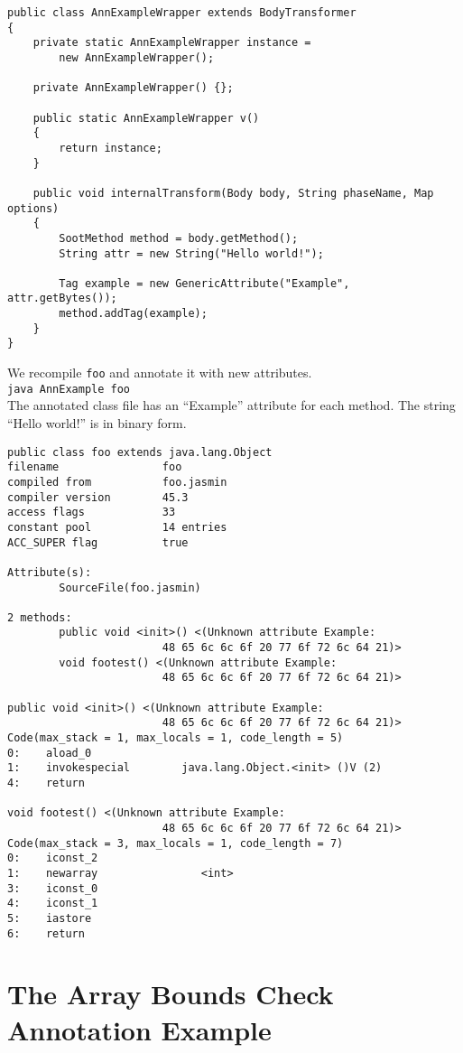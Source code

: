 \documentclass{article}
\begin{document}
\begin{verbatim}
public class AnnExampleWrapper extends BodyTransformer
{
    private static AnnExampleWrapper instance =
        new AnnExampleWrapper();

    private AnnExampleWrapper() {};

    public static AnnExampleWrapper v()
    {
        return instance;
    }

    public void internalTransform(Body body, String phaseName, Map options)
    {
        SootMethod method = body.getMethod();
        String attr = new String("Hello world!");
        
        Tag example = new GenericAttribute("Example", attr.getBytes());
        method.addTag(example);
    }
}
\end{verbatim}

We recompile {\tt foo} and annotate it with new attributes.\\
{\tt java AnnExample foo}\\ 
The annotated class file has an ``Example'' attribute for each method.
The string ``Hello world!'' is in binary form.

\begin{verbatim}
public class foo extends java.lang.Object
filename                foo
compiled from           foo.jasmin
compiler version        45.3
access flags            33
constant pool           14 entries
ACC_SUPER flag          true

Attribute(s):
        SourceFile(foo.jasmin)

2 methods:
        public void <init>() <(Unknown attribute Example: 
                        48 65 6c 6c 6f 20 77 6f 72 6c 64 21)>
        void footest() <(Unknown attribute Example: 
                        48 65 6c 6c 6f 20 77 6f 72 6c 64 21)>

public void <init>() <(Unknown attribute Example: 
                        48 65 6c 6c 6f 20 77 6f 72 6c 64 21)>
Code(max_stack = 1, max_locals = 1, code_length = 5)
0:    aload_0
1:    invokespecial        java.lang.Object.<init> ()V (2)
4:    return

void footest() <(Unknown attribute Example: 
                        48 65 6c 6c 6f 20 77 6f 72 6c 64 21)>
Code(max_stack = 3, max_locals = 1, code_length = 7)
0:    iconst_2
1:    newarray                <int>
3:    iconst_0
4:    iconst_1
5:    iastore
6:    return
\end{verbatim}

\section{The Array Bounds Check Annotation Example}
\end{document}

